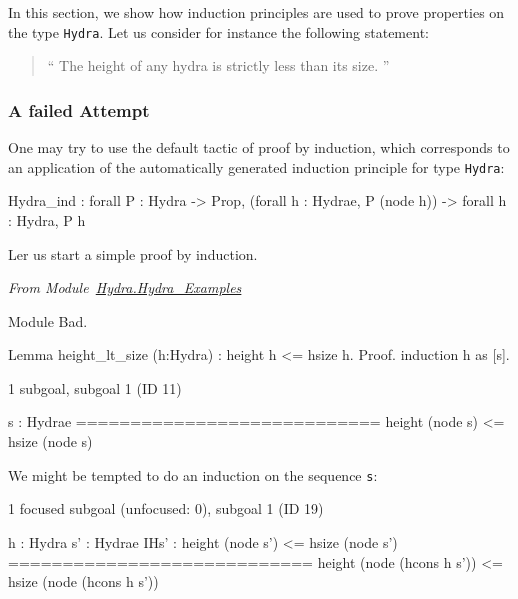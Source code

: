 In this section, we show how induction principles are used to prove properties on the type 
\texttt{Hydra}. Let us consider for instance the following statement:
\begin{quote}
  `` The height of any hydra is strictly less than its size. ''
\end{quote}



\subsubsection{A failed Attempt}

One may try to use the default tactic of proof by induction, which corresponds to an application of the automatically  generated  induction principle for  type \texttt{Hydra}:

\begin{Coqanswer}
Hydra_ind :
forall P : Hydra -> Prop,
(forall h : Hydrae, P (node h)) -> forall h : Hydra, P h
\end{Coqanswer}

Ler us start a simple proof by induction.

\vspace{4pt}
\noindent
\emph{From Module~\href{../theories/html/hydras.Hydra.Hydra_Examples.html}{Hydra.Hydra\_Examples}}

\begin{Coqbad}
Module Bad.

Lemma height_lt_size (h:Hydra) :
  height h <= hsize h.
Proof.
  induction h as [s].
\end{Coqbad}

\begin{Coqanswer}
1 subgoal, subgoal 1 (ID 11)
  
  s : Hydrae
  ============================
   height (node s) <= hsize (node s)
\end{Coqanswer}

We might be tempted to do an induction on the sequence \texttt{s}:



\begin{Coqanswer}
 1 focused subgoal
(unfocused: 0), subgoal 1 (ID 19)
  
  h : Hydra
  s' : Hydrae
  IHs' : height (node s') <= hsize (node s')
  ============================
   height (node (hcons h s')) <= hsize (node (hcons h s'))

\end{Coqanswer}

